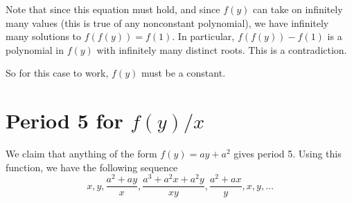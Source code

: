 \documentclass[12pt]{article}
\begin{document}
Note that since this equation must hold, and since $f(y)$ can take on infinitely many values (this is true of any nonconstant polynomial), we have infinitely many solutions to $f(f(y)) = f(1)$. In particular, $f(f(y)) - f(1)$ is a polynomial in $f(y)$ with infinitely many distinct roots. This is a contradiction.

So for this case to work, $f(y)$ must be a constant.

\section{Period 5 for $f(y)/x$}

We claim that anything of the form $f(y) = ay + a^2$ gives period 5. Using this function, we have the following sequence
\[ x, y, \frac{a^2+ay}{x}, \frac{a^3 + a^2x + a^2y}{xy}, \frac{a^2 + ax}{y}, x, y, \dots \]
\end{document}
